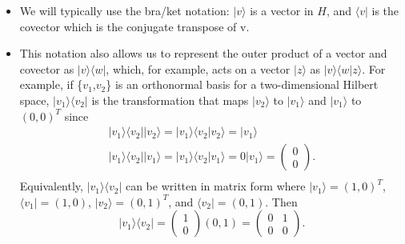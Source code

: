 \documentclass{article}
\def\pagedone{\newpage}
\def\ket#1{|{#1}\rangle}
\def\bra#1{\langle{#1}|}
\def\braket#1#2{\langle{#1}|{#2}\rangle}
\def\col#1#2{\left(\begin{array}{c}#1\\#2\end{array}\right)}
\def\tcol#1#2{(#1, #2)^T}
\def\hilbert{\mathit{H}}
\begin{document}
\pagedone

\pagedone
\begin{itemize}
	\item We will typically use the bra/ket notation: \newline
		$ \ket v $ is a vector in $\hilbert$, and \newline
		$ \bra v $ is the covector which is the conjugate transpose of v.
	\item This notation also allows us to represent the outer product of a vector and
		covector as $\ket v \bra w$, which, for example, acts on a vector $\ket z$
		as $\ket v \braket w z$.
		 For example, if \{$v_1$,$v_2$\} is an orthonormal basis for a two-dimensional
		  Hilbert space, $\ket {v_1}\bra {v_2}$ is the transformation
			that maps $\ket {v_2}$ to $\ket {v_1}$ and $\ket {v_1}$ to $\tcol 00$ since
			$$\begin{array}{l}
			\ket {v_1}\bra {v_2}\ket {v_2} = \ket {v_1}\braket {v_2}{v_2} = \ket {v_1}\\
			\ket {v_1}\bra {v_2}\ket {v_1} = \ket {v_1}\braket {v_2}{v_1} = 0 \ket {v_1} = \col 00.\\
  			\end{array}$$
			Equivalently, $\ket {v_1}\bra {v_2}$ can be written in matrix form where
			$\ket {v_1} = \tcol 10$, $\bra {v_1} = (1, 0)$, $\ket {v_2} = \tcol 01$,
			 and $\bra {v_2} = (0, 1)$.
			Then 
			$$\ket {v_1}\bra {v_2} = \col 10 (0, 1) = 
					\left(\begin{array}{cc}0&1\\0&0\end{array}\right).$$
	\end{itemize}
\end{document}
